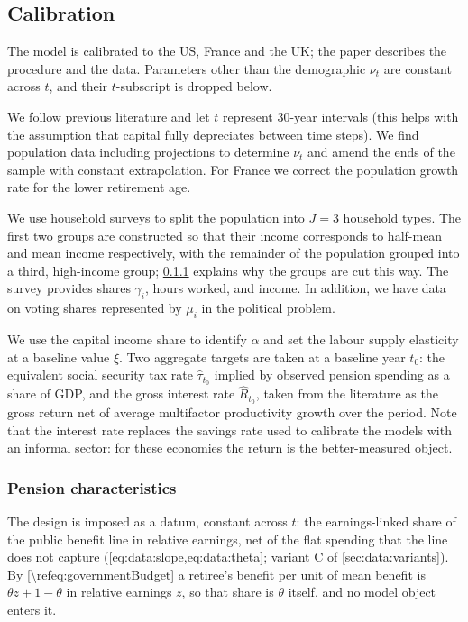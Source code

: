 \subsection{Calibration}\label{\refsec:calibration}
The model is calibrated to the US, France and the UK; the paper describes the procedure and the data. Parameters other than the demographic $\nu_t$ are constant across $t$, and their $t$-subscript is dropped below.

We follow previous literature and let $t$ represent 30-year intervals (this helps with the assumption that capital fully depreciates between time steps). We find population data including projections to determine $\nu_t$ and amend the ends of the sample with constant extrapolation. For France we correct the population growth rate for the lower retirement age.

We use household surveys to split the population into $J = 3$ household types. The first two groups are constructed so that their income corresponds to half-mean and mean income respectively, with the remainder of the population grouped into a third, high-income group; \cref{\refsec:calibration:theta} explains why the groups are cut this way. The survey provides shares $\gamma_i$, hours worked, and income. In addition, we have data on voting shares represented by $\mu_i$ in the political problem.

We use the capital income share to identify $\alpha$ and set the labour supply elasticity at a baseline value $\xi$. Two aggregate targets are taken at a baseline year $t_0$: the equivalent social security tax rate $\hat{\tau}_{t_0}$ implied by observed pension spending as a share of GDP, and the gross interest rate $\hat{R}_{t_0}$, taken from the literature as the gross return net of average multifactor productivity growth over the period. Note that the interest rate replaces the savings rate used to calibrate the models with an informal sector: for these economies the return is the better-measured object.


\subsubsection{Pension characteristics}\label{\refsec:calibration:theta}
The design is imposed as a datum, constant across $t$: the earnings-linked share of the public benefit line in relative earnings, net of the flat spending that the line does not capture (\cref{eq:data:slope,eq:data:theta}; variant C of \cref{sec:data:variants}). By \eqref{\refeq:governmentBudget} a retiree's benefit per unit of mean benefit is $\theta z + 1-\theta$ in relative earnings $z$, so that share is $\theta$ itself, and no model object enters it.


